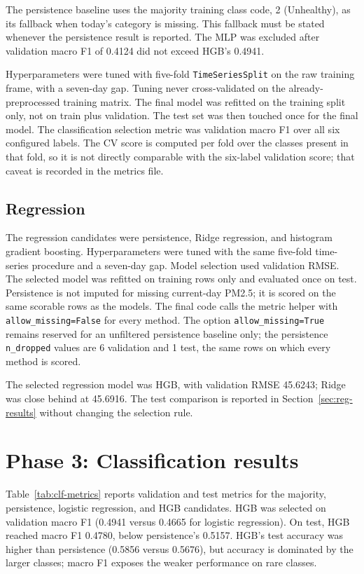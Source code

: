 \documentclass[11pt]{article}
\begin{document}
The persistence baseline uses the majority training class code, 2 (Unhealthy), as its fallback when today's category is missing. This fallback must be stated whenever the persistence result is reported. The MLP was excluded after validation macro F1 of 0.4124 did not exceed HGB's 0.4941.

Hyperparameters were tuned with five-fold \texttt{TimeSeriesSplit} on the raw training frame, with a seven-day gap. Tuning never cross-validated on the already-preprocessed training matrix. The final model was refitted on the training split only, not on train plus validation. The test set was then touched once for the final model. The classification selection metric was validation macro F1 over all six configured labels. The CV score is computed per fold over the classes present in that fold, so it is not directly comparable with the six-label validation score; that caveat is recorded in the metrics file.



\subsection{Regression}

The regression candidates were persistence, Ridge regression, and histogram gradient boosting. Hyperparameters were tuned with the same five-fold time-series procedure and a seven-day gap. Model selection used validation RMSE. The selected model was refitted on training rows only and evaluated once on test. Persistence is not imputed for missing current-day PM2.5; it is scored on the same scorable rows as the models. The final code calls the metric helper with \texttt{allow\_missing=False} for every method. The option \texttt{allow\_missing=True} remains reserved for an unfiltered persistence baseline only; the persistence \texttt{n\_dropped} values are 6 validation and 1 test, the same rows on which every method is scored.

The selected regression model was HGB, with validation RMSE 45.6243; Ridge was close behind at 45.6916. The test comparison is reported in Section~\ref{sec:reg-results} without changing the selection rule.

\section{Phase 3: Classification results}
\label{sec:clf-results}

Table~\ref{tab:clf-metrics} reports validation and test metrics for the majority, persistence, logistic regression, and HGB candidates. HGB was selected on validation macro F1 (0.4941 versus 0.4665 for logistic regression). On test, HGB reached macro F1 0.4780, below persistence's 0.5157. HGB's test accuracy was higher than persistence (0.5856 versus 0.5676), but accuracy is dominated by the larger classes; macro F1 exposes the weaker performance on rare classes.
\end{document}
